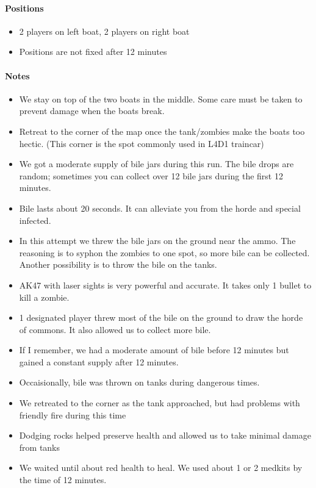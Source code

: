 \paragraph{Positions}
\begin{itemize}
\item 2 players on left boat, 2 players on right boat
\item Positions are not fixed after 12 minutes
\end{itemize}

\paragraph{Notes}
\begin{itemize}
\item We stay on top of the two boats in the middle. Some care must be taken to prevent damage when the boats break.
\item Retreat to the corner of the map once the tank/zombies make the boats too hectic. (This corner is the spot commonly used in L4D1 traincar)
\item We got a moderate supply of bile jars during this run. The bile drops are random; sometimes you can collect over 12 bile jars during the first 12 minutes.
\item Bile lasts about 20 seconds. It can alleviate you from the horde and special infected.
\item In this attempt we threw the bile jars on the ground near the ammo. The reasoning is to syphon the zombies to one spot, so more bile can be collected. Another possibility is to throw the bile on the tanks.
\item AK47 with laser sights is very powerful and accurate. It takes only 1 bullet to kill a zombie.
\item 1 designated player threw most of the bile on the ground to draw the horde of commons. It also allowed us to collect more bile.
\item If I remember, we had a moderate amount of bile before 12 minutes but gained a constant supply after 12 minutes.
\item Occaisionally, bile was thrown on tanks during dangerous times.
\item We retreated to the corner as the tank approached, but had problems with friendly fire during this time
\item Dodging rocks helped preserve health and allowed us to take minimal damage from tanks
\item We waited until about red health to heal. We used about 1 or 2 medkits by the time of 12 minutes.
\end{itemize}

